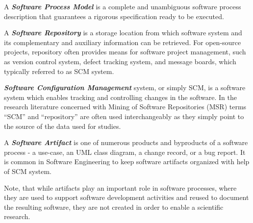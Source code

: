 
\begin{defn}\label{def_process_model}
A \textbf{\textit{Software Process Model}} is a complete and unambiguous software process description 
that guarantees a rigorous specification ready to be executed.
\end{defn}

\begin{defn}\label{def_repository}
A \textbf{\textit{Software Repository}} is a storage location from which software system and its complementary 
and auxiliary information can be retrieved. For open-source projects, repository often provides means for software
project management, such as version control system, defect tracking system, and message boards, which 
typically referred to as SCM system.
\end{defn}

\begin{defn}\label{scm_system}
\textbf{\textit{Software Configuration Management}} system, or simply SCM, is a software system which enables
tracking and controlling changes in the software. In the research literature concerned with Mining of Software 
Repositories (MSR) terms ``SCM'' and ``repository'' are often used interchangeably as they simply point to the 
source of the data used for studies. 
\end{defn}

\begin{defn}\label{def_artifact}
A \textbf{\textit{Software Artifact}} is one of numerous products and byproducts of a software process - 
a use-case, an UML class diagram, a change record, or a bug report. It is common in Software Engineering
to keep software artifacts organized with help of SCM system.
\end{defn}
Note, that while artifacts play an important role in software processes, where they are used to support 
software development activities and reused to document the resulting software, they are not created 
in order to enable a scientific research.

